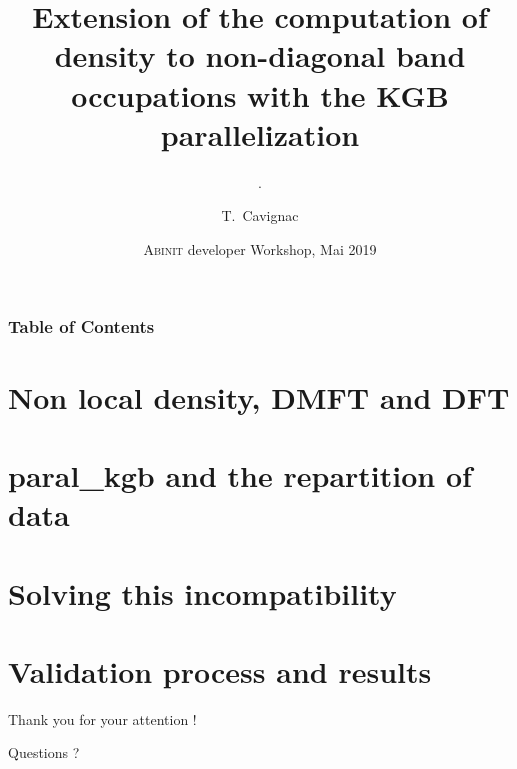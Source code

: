 \documentclass[22pt]{beamer}
\title{Extension of the computation of density to non-diagonal band occupations with the KGB parallelization}
\subtitle{.}
\author{T.~Cavignac}
\institute{
  CEA DAM Ile-de-France
  \and
  École Centrale de Lyon
}
\date{\textsc{Abinit} developer Workshop, Mai 2019}
\newcommand{\nologo}{\logo{}}
\begin{document}
  \frame{\titlepage}

  \nologo

  \begin{frame}
    \frametitle{Table of Contents}
    \tableofcontents
  \end{frame}

  \section{Non local density, DMFT and DFT}
  

  \section{paral\_kgb and the repartition of data}
  

  \section{Solving this incompatibility}
  

  \section{Validation process and results}
  

  {\nologo
    \begin{frame}[focus]
      Thank you for your attention !
    \end{frame}

    \begin{frame}[focus]
      Questions ?
    \end{frame}
  }
\end{document}
